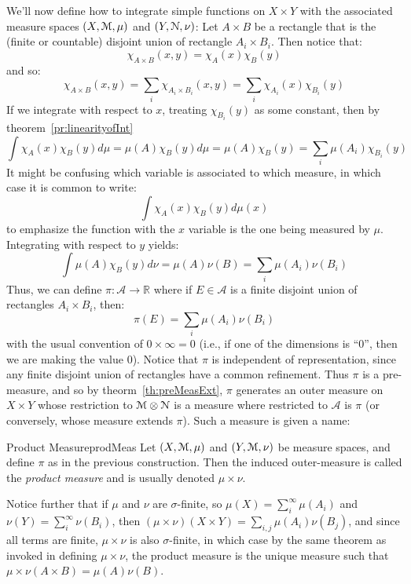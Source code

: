 \documentclass[oneside]{book}
\newcommand{\R}{\mathbb{R}}
\newcommand{\CA}{\mathcal{A}}
\newcommand{\EM}{\EuScript{M}}
\newcommand{\EN}{\EuScript{N}}
\newcommand{\rw}{\rightarrow}
\begin{document}
We'll now define how to integrate simple functions on $X\times Y$ with the associated measure spaces $(X, \EM, \mu)$ and
$(Y, \EN, \nu)$: Let $A\times B$ be a rectangle that is the (finite or
countable) disjoint union of rectangle $A_i\times B_i$. Then notice that:
\[
	\chi_{A\times B}(x,y) = \chi_{A}(x)\chi_{B}(y)
\]
and so:
\[
	\chi_{A\times B}(x,y) = \sum_i \chi_{A_i\times B_i}(x,y) = \sum_i \chi_{A_i}(x)\chi_{B_i}(y)
\]
If we integrate with respect to $x$, treating $\chi_{B_i}(y)$ as some constant, then by theorem~\ref{pr:linearityofInt}
\[
	\int \chi_{A}(x)\chi_B(y)d\mu = \mu(A)\chi_{B}(y)d\mu = \mu(A)\chi_B(y) = \sum_i \mu(A_i)\chi_{B_i}(y)
\]
It might be confusing which variable is associated to which measure, in which case it is common to write:
\[
	\int \chi_A(x)\chi_B(y)d\mu(x)
\]
to emphasize the function with the $x$ variable is the one being measured by $\mu$.
Integrating with respect to $y$ yields:
\[
	\int \mu(A)\chi_B(y)d\nu = \mu(A)\nu(B) = \sum_i \mu(A_i)\nu(B_i)
\]
Thus, we can define $\pi: \CA \rw \R$ where if $E \in \CA$ is a finite disjoint union of rectangles $A_i\times B_i$,
then:
\[
	\pi(E) = \sum_i \mu(A_i)\nu(B_i)
\]
with the usual convention of $0\times \infty = 0$ (i.e., if one of the dimensions is ``$0$'', then we are making the value
$0$). Notice that $\pi$ is independent of representation, since any finite disjoint union of rectangles have a common
refinement. Thus $\pi$ is a pre-measure, and so by theorm~\ref{th:preMeasExt}, $\pi$ generates an outer measure on
$X\times Y$ whose restriction to $\EM\otimes \EN$ is a measure where restricted to $\CA$ is $\pi$ (or conversely, whose
measure extends $\pi$). Such a measure is given a name:

\begin{defn}{Product Measure}{prodMeas}
	Let $(X, \EM, \mu)$ and $(Y, \EM, \nu)$ be measure spaces, and define $\pi$ as in the previous construction. Then
	the induced outer-measure is called the \emph{product measure} and is usually denoted $\mu\times \nu$. 
\end{defn}

Notice further that if $\mu$ and $\nu$ are $\sigma$-finite, so $\mu(X) = \sum_i^\infty \mu(A_i)$ and $\nu(Y)
= \sum_i^\infty \nu(B_i)$, then $(\mu\times \nu)(X\times Y) = \sum_{i,j} \mu(A_i)\nu(B_j)$, and since all terms are
finite, $\mu\times \nu$ is also $\sigma$-finite, in which case by the same theorem as invoked in defining $\mu\times
\nu$, the product measure is the unique measure such that $\mu\times \nu(A\times B) = \mu(A)\nu(B)$. 
\end{document}
